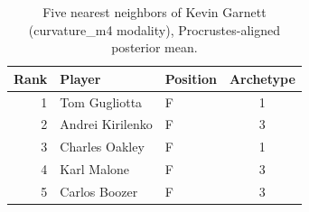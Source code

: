 \begin{table}[htbp]
  \centering\small
  \begin{tabular}{rllc}
    \toprule
    Rank & Player & Position & Archetype \\
    \midrule
    1 & Tom Gugliotta & F & 1 \\
    2 & Andrei Kirilenko & F & 3 \\
    3 & Charles Oakley & F & 1 \\
    4 & Karl Malone & F & 3 \\
    5 & Carlos Boozer & F & 3 \\
    \bottomrule
  \end{tabular}
  \caption{Five nearest neighbors of Kevin Garnett (curvature_m4 modality), Procrustes-aligned posterior mean.}
  \label{tab:Kevin_Garnett_neighbors_curvature_m4}
\end{table}

